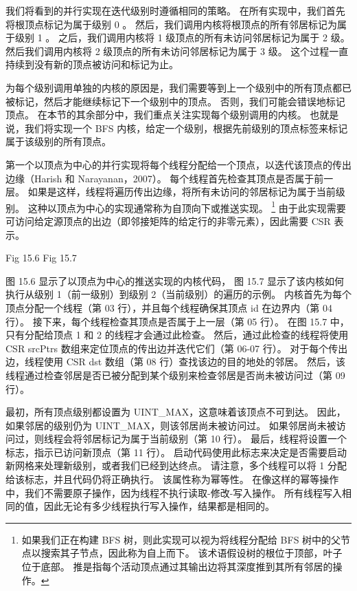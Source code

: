 我们将看到的并行实现在迭代级别时遵循相同的策略。 在所有实现中，我们首先将根顶点标记为属于级别 0 。 
然后，我们调用内核将根顶点的所有邻居标记为属于级别 1 。 之后，我们调用内核将 1 级顶点的所有未访问邻居标记为属于 2 级。 
然后我们调用内核将 2 级顶点的所有未访问邻居标记为属于 3 级。 这个过程一直持续到没有新的顶点被访问和标记为止。

为每个级别调用单独的内核的原因是，我们需要等到上一个级别中的所有顶点都已被标记，然后才能继续标记下一个级别中的顶点。 
否则，我们可能会错误地标记顶点。 在本节的其余部分中，我们重点关注实现每个级别调用的内核。 
也就是说，我们将实现一个 BFS 内核，给定一个级别，根据先前级别的顶点标签来标记属于该级别的所有顶点。

第一个以顶点为中心的并行实现将每个线程分配给一个顶点，以迭代该顶点的传出边缘（Harish 和 Narayanan，2007）。 
每个线程首先检查其顶点是否属于前一层。 如果是这样，线程将遍历传出边缘，将所有未访问的邻居标记为属于当前级别。 
这种以顶点为中心的实现通常称为自顶向下或推送实现。 
\footnote{如果我们正在构建 BFS 树，则此实现可以视为将线程分配给 BFS 树中的父节点以搜索其子节点，因此称为自上而下。 
该术语假设树的根位于顶部，叶子位于底部。 推是指每个活动顶点通过其输出边将其深度推到其所有邻居的操作。}
由于此实现需要可访问给定源顶点的出边（即邻接矩阵的给定行的非零元素），因此需要 CSR 表示。

{\color{red} Fig 15.6}
{\color{red} Fig 15.7}

图 15.6 显示了以顶点为中心的推送实现的内核代码，
图 15.7 显示了该内核如何执行从级别 1（前一级别）到级别 2（当前级别）的遍历的示例。 
内核首先为每个顶点分配一个线程（第 03 行），并且每个线程确保其顶点 id 在边界内（第 04 行）。 
接下来，每个线程检查其顶点是否属于上一层（第 05 行）。 在图 15.7 中，只有分配给顶点 1 和 2 的线程才会通过此检查。 
然后，通过此检查的线程将使用 CSR srcPtrs 数组来定位顶点的传出边并迭代它们（第 06-07 行）。 
对于每个传出边，线程使用 CSR dst 数组（第 08 行）查找该边的目的地处的邻居。 
然后，该线程通过检查邻居是否已被分配到某个级别来检查邻居是否尚未被访问过（第 09 行）。

最初，所有顶点级别都设置为 UINT\_MAX，这意味着该顶点不可到达。 
因此，如果邻居的级别仍为 UINT\_MAX，则该邻居尚未被访问过。 
如果邻居尚未被访问过，则线程会将邻居标记为属于当前级别（第 10 行）。 
最后，线程将设置一个标志，指示已访问新顶点（第 11 行）。 
启动代码使用此标志来决定是否需要启动新网格来处理新级别，或者我们已经到达终点。 
请注意，多个线程可以将 1 分配给该标志，并且代码仍将正确执行。 该属性称为幂等性。 
在像这样的幂等操作中，我们不需要原子操作，因为线程不执行读取-修改-写入操作。 
所有线程写入相同的值，因此无论有多少线程执行写入操作，结果都是相同的。

